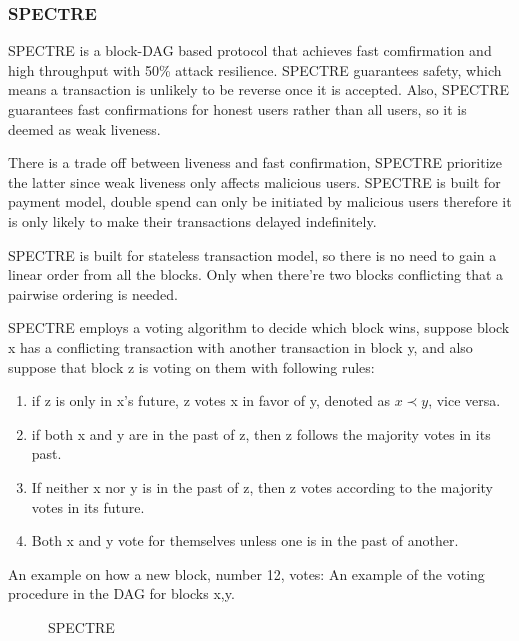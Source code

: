 \documentclass[a4paper,11pt]{article}
\begin{document}
\subsubsection*{SPECTRE}
SPECTRE is a block-DAG based protocol that achieves fast comfirmation and high throughput with 50\% attack resilience. SPECTRE guarantees safety, which means a transaction is unlikely to be reverse once it is accepted. Also, SPECTRE guarantees fast confirmations for honest users rather than all users, so it is deemed as weak liveness.

There is a trade off between liveness and fast confirmation, SPECTRE prioritize the latter since weak liveness only affects malicious users. SPECTRE is built for payment model, double spend can only be initiated by malicious users therefore it is only likely to make their transactions delayed indefinitely.

SPECTRE is built for stateless transaction model, so there is no need to gain a linear order from all the blocks. Only when there're two blocks conflicting that a pairwise ordering is needed.

SPECTRE employs a voting algorithm to decide which block wins, suppose block x has a conflicting transaction with another transaction in block y, and also suppose that block z is voting on them with following rules:


\begin{enumerate}
	\item if z is only in x's future, z votes x in favor of y, denoted as $x \prec y$, vice versa.
	\item if both x and y are in the past of z, then z follows the majority votes in its past.
	\item If neither x nor y is in the past of z, then z votes according to the majority votes in its future.
	\item Both x and y vote for themselves unless one is in the past of another.
\end{enumerate}


An example on how a new block, number 12, votes: An example of the voting procedure in the DAG for blocks x,y.

\clearpage

\begin{figure}[h]
	\centerline{%
	}
\caption{SPECTRE}
\end{figure}
\end{document}
